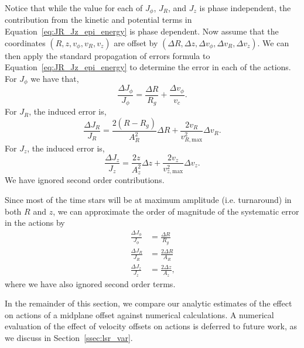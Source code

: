 \documentclass[twocolumn]{aastex62}
\newcommand{\beq}{\begin{equation}}
\newcommand{\eeq}{\end{equation}}
\begin{document}
Notice that while the value for each of $J_{\phi}$, $J_R$, and $J_z$ is phase
independent, the contribution from the kinetic and potential terms in
Equation~\eqref{eq:JR_Jz_epi_energy} is phase dependent. Now assume that the
coordinates $(R, z, v_{\phi}, v_R, v_z)$ are offset by $(\Delta R, \Delta z,
\Delta v_{\phi}, \Delta v_R, \Delta v_z)$. We can then apply the standard
propagation of errors formula to Equation~\eqref{eq:JR_Jz_epi_energy}
to determine the error in each of the actions. For $J_{\phi}$ we have that,
\beq\label{eq:induced_Jphi}
\frac{\Delta J_{\phi}}{J_{\phi}} = \frac{\Delta R}{R_g} 
                                    + \frac{\Delta v_{\phi}}{v_c}\text{.}
\eeq
For $J_R$, the induced error is,
\beq\label{eq:induced_JR}
\frac{\Delta J_R}{J_R} = \frac{2(R-R_g)}{A_R^2}\Delta R
                         + \frac{2v_R}{v_{R,\text{max}}^2} \Delta v_R \text{.}
\eeq
For $J_z$, the induced error is,
\beq\label{eq:induced_Jz}
\frac{\Delta J_z}{J_z} = \frac{2z}{A_z^2}\Delta z
                         + \frac{2v_z}{v_{z,\text{max}}^2} \Delta v_z \text{.}
\eeq
We have ignored second order contributions.

Since most of the time stars will be at maximum amplitude (i.e. turnaround) in
both $R$ and $z$, we can approximate the order of magnitude of the systematic
error in the actions by
\beq\label{eq:Ji_err_mosttime}
\begin{split}
\frac{\Delta J_{\phi}}{J_{\phi}} &= \frac{\Delta R}{R_g} \\
\frac{\Delta J_{R}}{J_{R}} &= \frac{2\Delta R}{A_R} \\
\frac{\Delta J_{z}}{J_{z}} &= \frac{2\Delta z}{A_z} \text{,}
\end{split}
\eeq
where we have also ignored second order terms.

In the remainder of this section, we compare our analytic estimates of the
effect on actions of a midplane offset against numerical calculations. A
numerical evaluation of the effect of velocity offsets on actions is deferred
to future work, as we discuss in Section~\ref{ssec:lsr_var}.
\end{document}

